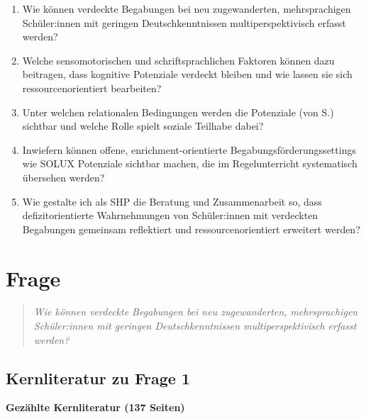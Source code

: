 \documentclass[ngerman, a4paper]{article}
\begin{document}
\begin{enumerate}
  \item[\textbf{FW\,1}] Wie können verdeckte Begabungen bei neu zugewanderten, 
  mehrsprachigen Schüler:innen mit geringen Deutschkenntnissen multiperspektivisch
  erfasst werden?
  \item[\textbf{FW\,2}] Welche sensomotorischen und schriftsprachlichen
    Faktoren können dazu beitragen, dass kognitive Potenziale verdeckt bleiben
    und wie lassen sie sich 
    ressourcenorientiert bearbeiten?
  \item[\textbf{FW\,3}] Unter welchen relationalen Bedingungen werden
    die Potenziale (von S.) sichtbar und welche Rolle spielt soziale
    Teilhabe dabei?
  \item[\textbf{BW\,4}] Inwiefern können offene, enrichment-orientierte 
  Begabungsförderungssettings wie SOLUX Potenziale sichtbar machen, die 
  im Regelunterricht systematisch übersehen werden?					
  \item[\textbf{BW\,5}] Wie gestalte ich als SHP die Beratung und Zusammenarbeit so, 
  dass defizitorientierte
Wahrnehmungen von Schüler:innen mit verdeckten Begabungen gemeinsam reflektiert
und ressourcenorientiert erweitert werden?
\end{enumerate}


\newpage

\section{Frage}
\label{sec:frage1}
 
\begin{quote}\itshape
Wie können verdeckte Begabungen bei neu zugewanderten, 
mehrsprachigen Schüler:innen mit geringen Deutschkenntnissen multiperspektivisch
erfasst werden?
\end{quote}

\subsection{Kernliteratur zu Frage 1}
 
\textbf{Gezählte Kernliteratur (137 Seiten)}
\end{document}
